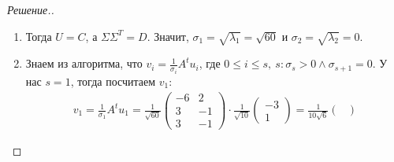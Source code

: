 \documentclass[a4paper]{article}
\theoremstyle{remark}
\newcommand{\arrtw}[2]{%
  \ensuremath{\xrightarrow{\text{Э}_2(#1,\; #2)}}%
}
\newcommand{\arrth}[2]{%
  \ensuremath{\xrightarrow{\text{Э}_3(#1,\; #2)}}%
}
\begin{document}
\begin{proof}[Решение.]
\begin{enumerate}
\begin{itemize}
\begin{align*}
\begin{pmatrix}
                  0 & 0 \\
                  -18 & 6
                \end{pmatrix} \arrtw{1}{2} \begin{pmatrix}
                  -18 & 6 \\
                  0 & 0
                \end{pmatrix} \arrth{1}{-\nicefrac{1}{3}} \begin{pmatrix}
                  3 & -1 \\
                  0 & 0
                \end{pmatrix}
              \end{align*}
              Тогда ФСР~--- один вектор $\begin{pmatrix}
                1 & 3
              \end{pmatrix}$. Нормируем и получим вектор $\frac{1}{\sqrt{10}}\begin{pmatrix}
                1 & 3
              \end{pmatrix}$.
            \end{itemize}
            Тогда матрица $C$ выглядит так:
            \begin{equation*}
              C = \frac{1}{\sqrt{10}} \begin{pmatrix}
                -3 & 1 \\
                1 & 3
              \end{pmatrix}.
            \end{equation*}
            \item Тогда $U = C$, а $\Sigma\Sigma^T = D$. Значит, $\sigma_1 = \sqrt{\lambda_1} = \sqrt{60}$ и $\sigma_2 = \sqrt{\lambda_2} = 0$.
            \item Знаем из алгоритма, что $v_i = \frac{1}{\sigma_i}A^t u_i$, где $0 \leq i \leq s,\ s: \sigma_s > 0 \wedge \sigma_{s+1} = 0$. У нас $s = 1$, тогда посчитаем $v_1$:
            \begin{align*}
              v_1 = \frac{1}{\sigma_1} A^t u_1 = \frac{1}{\sqrt{60}} \begin{pmatrix}
                -6 & 2 \\
                3 & -1 \\
                3 & -1      
              \end{pmatrix} \cdot \frac{1}{\sqrt{10}} \begin{pmatrix}
                -3 \\
                1
              \end{pmatrix} = \frac{1}{10\sqrt{6}} \begin{pmatrix}

\end{pmatrix}
\end{align*}
\end{enumerate}
\end{proof}
\end{document}
